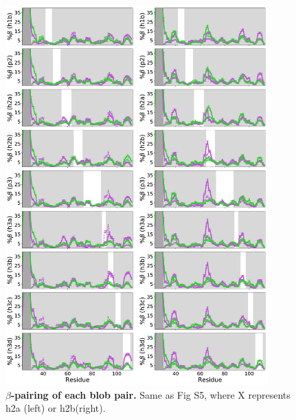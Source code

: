 \documentclass[10pt,letterpaper]{article}
\begin{document}
\begin{figure}[!ht]
\includegraphics[scale=0.5,width=0.9\textwidth,trim={0 0cm 0 0cm},clip]{./figures/S7.pdf}
\caption{{\bf $\beta$-pairing of each blob pair.} Same as Fig S5, where X represents h2a (left) or h2b(right).} 
\label{S6} 
\end{figure}
\end{document}
